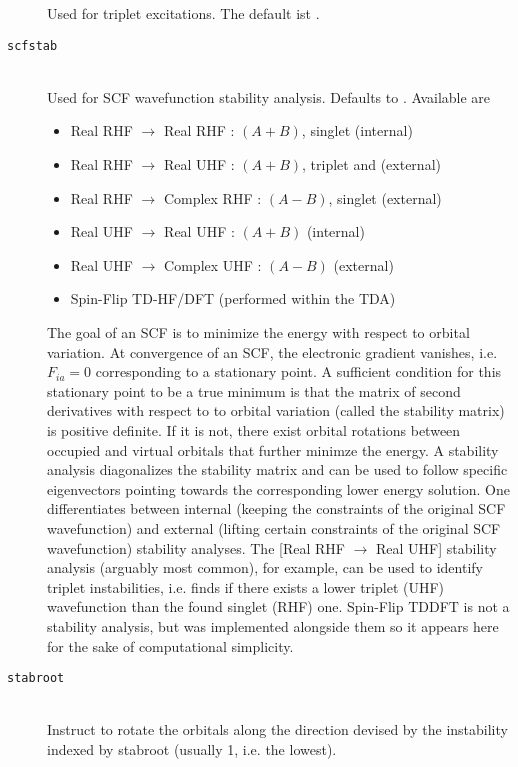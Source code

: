 \begin{description}
    Used for triplet excitations. The default ist .
    \item [\texttt{scfstab}]\hfill \\
    Used for SCF wavefunction stability analysis. Defaults to . Available are
    \begin{itemize}
      \item Real RHF $\rightarrow$ Real RHF    : $(A+B)$, singlet  (internal)
      \item Real RHF $\rightarrow$ Real UHF    : $(A+B)$, triplet  and  (external)
      \item Real RHF $\rightarrow$ Complex RHF : $(A-B)$, singlet  (external)
      \item Real UHF $\rightarrow$ Real UHF    : $(A+B)$  (internal)
      \item Real UHF $\rightarrow$ Complex UHF : $(A-B)$  (external)
      \item Spin-Flip TD-HF/DFT  (performed within the TDA)
    \end{itemize}
    The goal of an SCF is to minimize the energy with respect to orbital variation. At convergence of an SCF, the electronic gradient vanishes,
    i.e. $F_{ia} = 0$ corresponding to a stationary point. A sufficient condition for this stationary point to be a true minimum is that the matrix of 
    second derivatives with respect to to orbital variation (called the stability matrix) is positive definite. If it is not, there exist orbital rotations
    between occupied and virtual orbitals that further minimze the energy. A stability analysis diagonalizes the stability matrix and can be used
    to follow specific eigenvectors pointing towards the corresponding lower energy solution.
    One differentiates between internal (keeping the constraints of the original SCF wavefunction) and external (lifting certain constraints of the original SCF wavefunction) stability analyses.
    The [Real RHF $\rightarrow$ Real UHF] stability analysis (arguably most common), for example, can be used to identify triplet instabilities, i.e. finds
    if there exists a lower triplet (UHF) wavefunction than the found singlet (RHF) one. Spin-Flip TDDFT is not a stability analysis, but was
    implemented alongside them so it appears here for the sake of computational simplicity.
    \item [\texttt{stabroot}]\hfill \\
    Instruct to rotate the orbitals along the direction devised by the instability indexed by stabroot (usually 1, i.e. the lowest). 

\end{description}
